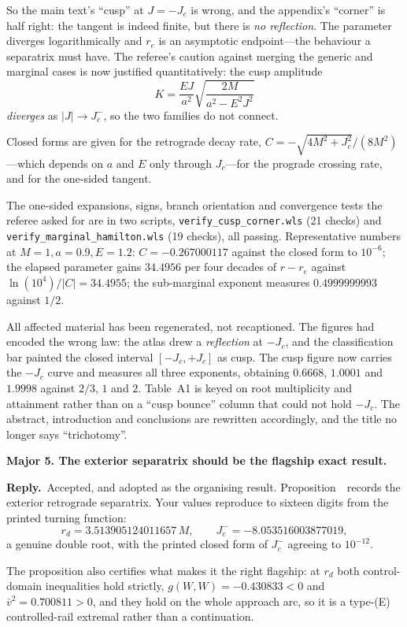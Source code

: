 \documentclass[11pt]{article}
\newcommand{\reply}{\par\noindent\textbf{Reply.}\ }
\newcommand{\R}[1]{\par\medskip\noindent\textbf{#1}\par\nopagebreak}
\begin{document}
So the main text's ``cusp'' at $J=-J_c$ is wrong, and the appendix's ``corner''
is half right: the tangent is indeed finite, but there is \emph{no reflection}.
The parameter diverges logarithmically and $r_e$ is an asymptotic endpoint---the
behaviour a separatrix must have. The referee's caution against merging the
generic and marginal cases is now justified quantitatively: the cusp amplitude
\[
  K=\frac{EJ}{a^2}\sqrt{\frac{2M}{a^2-E^2J^2}}
\]
\emph{diverges} as $|J|\to J_c^-$, so the two families do not connect.

Closed forms are given for the retrograde decay rate,
$C=-\sqrt{4M^2+J_c^2}/(8M^2)$---which depends on $a$ and $E$ only through
$J_c$---for the prograde crossing rate, and for the one-sided tangent.

The one-sided expansions, signs, branch orientation and convergence tests the
referee asked for are in two scripts, \texttt{verify\_cusp\_corner.wls} (21
checks) and \texttt{verify\_marginal\_hamilton.wls} (19 checks), all passing.
Representative numbers at $M=1,a=0.9,E=1.2$: $C=-0.267000117$ against the closed
form to $10^{-6}$; the elapsed parameter gains $34.4956$ per four decades of
$r-r_e$ against $\ln(10^4)/|C|=34.4955$; the sub-marginal exponent measures
$0.4999999993$ against $1/2$.

All affected material has been regenerated, not recaptioned. The figures had
encoded the wrong law: the atlas drew a \emph{reflection} at $-J_c$, and the
classification bar painted the closed interval $[-J_c,+J_c]$ as cusp. The cusp
figure now carries the $-J_c$ curve and measures all three exponents, obtaining
$0.6668$, $1.0001$ and $1.9998$ against $2/3$, $1$ and $2$. Table~A1 is keyed on
root multiplicity and attainment rather than on a ``cusp bounce'' column that
could not hold $-J_c$. The abstract, introduction and conclusions are rewritten
accordingly, and the title no longer says ``trichotomy''.

\R{Major 5. The exterior separatrix should be the flagship exact result.}

\reply Accepted, and adopted as the organising result. Proposition~\msPropExteriorSep\ records
the exterior retrograde separatrix. Your values reproduce to sixteen digits from
the printed turning function:
\[
  r_d=3.513905124011657\,M,\qquad J_c^-=-8.053516003877019,
\]
a genuine double root, with the printed closed form of $J_c^-$ agreeing to
$10^{-12}$.

The proposition also certifies what makes it the right flagship: at $r_d$ both
control-domain inequalities hold strictly, $g(W,W)=-0.430833<0$ and
$\bar v^2=0.700811>0$, and they hold on the whole approach arc, so it is a
type-(E) controlled-rail extremal rather than a continuation.
\end{document}
